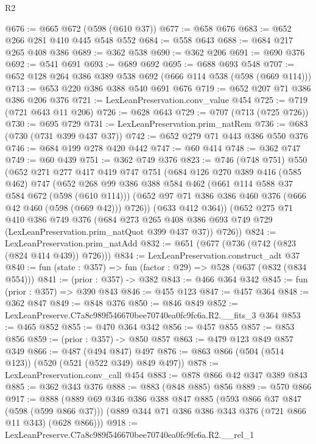 \begin{lexlean}{R2}
\begin{coremodule}
@676 := @665 @672 (@598 (@610 @37))
@677 := @658 @676
@683 := @652 @266 @281 @410 @445 @548 @552
@684 := @558 @643
@688 := @684 @217 @265 @408 @386
@689 := @362 @538
@690 := @362 @206
@691 := @690 @376
@692 := @541 @691
@693 := @689 @692
@695 := @688 @693 @548
@707 := @652 @128 @264 @386 @389 @538 @692 (@666 @114 @538 (@598 (@669 @114)))
@713 := @653 @220 @386 @388 @540 @691 @676
@719 := @652 @207 @71 @386 @386 @206 @376
@721 := LexLeanPreservation.conv_value @454
@725 := @719 (@721 @643 @11 @206)
@726 := @628 @643
@729 := @707 (@713 (@725 @726))
@730 := @695 @729
@731 := LexLeanPreservation.prim_natRem
@736 := @683 (@730 (@731 @399 @437 @37))
@742 := @652 @279 @71 @443 @386 @550 @376
@746 := @684 @199 @278 @420 @442
@747 := @60 @414
@748 := @362 @747
@749 := @60 @439
@751 := @362 @749 @376
@823 := @746
    (@748 @751)
    @550
    (@652
      @271
      @277
      @417
      @419
      @747
      @751
      (@684
        @126
        @270
        @389
        @416
        (@585 @462)
        @747
        (@652
          @268
          @99
          @386
          @388
          @584
          @462
          (@661 @114 @588 @37 @584 @672 (@598 (@610 @114)))
          (@652 @97 @71 @386 @386 @460 @376 (@666 @42 @460 (@598 (@669 @42))) @726))
        (@633 @412 @364))
      (@652
        @275
        @71
        @410
        @386
        @749
        @376
        (@684 @273 @265 @408 @386 @693 @749 @729 (LexLeanPreservation.prim_natQuot @399 @437 @37))
        @726))
@824 := LexLeanPreservation.prim_natAdd
@832 := @651 (@677 (@736 (@742 (@823 (@824 @414 @439)) @726)))
@834 := LexLeanPreservation.construct_adt @37
@840 := fun (state : @357) => fun (factor : @29) => @528 (@637 (@832 (@834 @554)))
@841 := (prior : @357) -> @382
@843 := @466 @364 @342
@845 := fun (prior : @357) => @390 @843
@846 := @455 @123
@847 := @457 @364
@848 := @362 @847
@849 := @848 @376
@850 := @846 @849
@852 := LexLeanPreserve.C7a8c989f546670bee70740ea0fc9fc6a.R2.__fits_3 @364
@853 := @465 @852
@855 := @470 @364 @342
@856 := @457 @855
@857 := @853 @856
@859 := (prior : @357) -> @850 @857
@863 := @479 @123 @849 @857 @349
@866 := @487 (@494 @847) @497
@876 := @863 @866 (@504 (@514 @123)) (@520 (@521 (@522 @349) @849 @497))
@878 := LexLeanPreservation.conv_call @454
@883 := @878 @866 @42 @347 @389 @843
@885 := @362 @343 @376
@888 := @883 (@848 @885) @856
@889 := @570 @866
@917 := @888
    (@889
      @69
      @346
      @386
      @388
      @847
      @885
      (@593 @866 @37 @847 (@598 (@599 @866 @37)))
      (@889 @344 @71 @386 @386 @343 @376 (@721 @866 @11 @343) (@628 @866)))
@918 := LexLeanPreserve.C7a8c989f546670bee70740ea0fc9fc6a.R2.__rel_1

\end{coremodule}
\end{lexlean}
